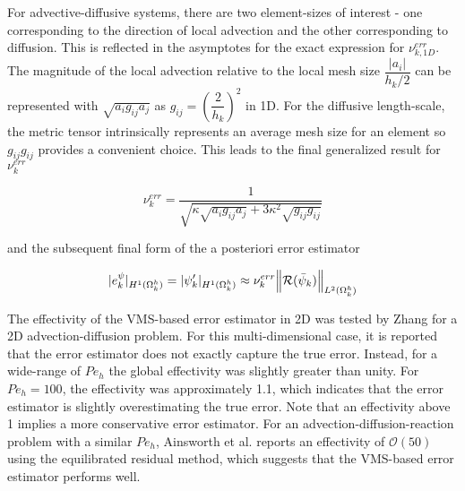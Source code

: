 


For advective-diffusive systems, there are two element-sizes of interest - one corresponding to the direction of local advection and the other corresponding to diffusion.
This is reflected in the asymptotes for the exact expression for $\nu^{err}_{k,1D}$. %
The magnitude of the local advection relative to the local mesh size $\dfrac{|a_i|}{h_k/2}$ can be represented with $\sqrt{a_i g_{ij} a_j}$ as $g_{ij} = \left(\dfrac{2}{h_k}\right)^2$ in 1D.
For the diffusive length-scale, the metric tensor intrinsically represents an average mesh size for an element so $g_{ij}g_{ij}$ provides a convenient choice.
This leads to the final generalized result for $\nu^{err}_k$

\begin{equation}
    \nu^{err}_{k} = \dfrac{1}{\sqrt{ \kappa\sqrt{a_i g_{ij} a_j} + 3\kappa^2\sqrt{g_{ij}g_{ij}}  }  }
\end{equation}

\noindent and the subsequent final form of the a posteriori error estimator

\begin{equation}
      |e^{\psi}_k|_{H^{1}(\Omega^h_k)} = |\psi'_k|_{H^1(\Omega^h_k)} \approx \nu^{err}_{k} \norm{\mathcal{R}(\bar{\psi}_k)}_{L^2(\Omega^h_k)}
      \label{eq:VMSerr}
\end{equation}

The effectivity of the VMS-based error estimator in 2D was tested by Zhang \cite{zhang19} for a 2D advection-diffusion problem. For this multi-dimensional case, it is reported that the error estimator does not exactly capture the true error. Instead, for a wide-range of $Pe_h$ the global effectivity was slightly greater than unity.   
For $Pe_h=100$, the effectivity was approximately 1.1, which indicates that the error estimator is slightly overestimating the true error.
Note that an effectivity above 1 implies a more conservative error estimator. 
For an advection-diffusion-reaction problem with a similar $Pe_h$, Ainsworth et al. \cite{ainsworth2013fully} reports an effectivity of $\mathcal{O}(50)$ using the equilibrated residual method, which suggests that the VMS-based error estimator performs well.

 

